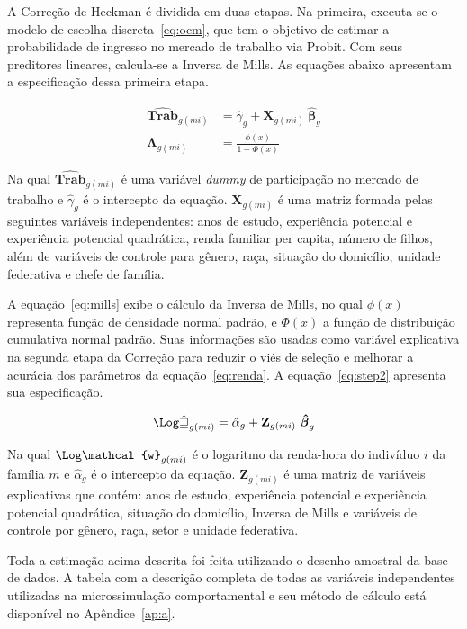 A Correção de Heckman \cite{heckman79} é dividida em duas etapas. Na primeira, executa-se o modelo de escolha discreta~\eqref{eq:ocm}, que tem o objetivo de estimar a probabilidade de ingresso no mercado de trabalho via Probit. Com seus preditores lineares, calcula-se a Inversa de Mills. As equações abaixo apresentam a especificação dessa primeira etapa.

\begin{align}
	\boldsymbol{\hat{Trab}}_{g(mi)} &= \hat{\gamma}_g + \mathbf{X}_{g(mi)} \ \boldsymbol{\hat{\beta}}_g \label{eq:step1} \\
	\boldsymbol{\Lambda}_{g(mi)}    &= \frac{\phi(x)}{1 - \Phi(x)} \label{eq:mills}
\end{align}

Na qual $\boldsymbol{\hat{Trab}}_{g(mi)}$ é uma variável \textit{dummy} de participação no mercado de trabalho e $\hat{\gamma}_g$ é o intercepto da equação. $\mathbf{X}_{g(mi)}$ é uma matriz formada pelas seguintes variáveis independentes: anos de estudo, experiência potencial e experiência potencial quadrática, renda familiar per capita, número de filhos, além de variáveis de controle para gênero, raça, situação do domicílio, unidade federativa e chefe de família.

A equação~\eqref{eq:mills} exibe o cálculo da Inversa de Mills, no qual $\phi(x)$ representa função de densidade normal padrão, e $\Phi(x)$ a função de distribuição cumulativa normal padrão. Suas informações são usadas como variável explicativa na segunda etapa da Correção para reduzir o viés de seleção e melhorar a acurácia dos parâmetros da equação~\eqref{eq:renda}. A equação~\eqref{eq:step2} apresenta sua especificação.

\begin{align}
	\mathbf{\Log \mathcal{\hat{w}}}_{g(mi)} = \hat{\alpha}_g + \mathbf{Z}_{g(mi)} \ \boldsymbol{\hat{\beta}}_g \label{eq:step2}
\end{align}

Na qual $\mathbf{\Log \mathcal{w}}_{g(mi)}$ é o logaritmo da renda-hora do indivíduo $i$ da família $m$ e $\hat{\alpha}_g$ é o intercepto da equação. $\mathbf{Z}_{g(mi)}$ é uma matriz de variáveis explicativas que contém: anos de estudo, experiência potencial e experiência potencial quadrática, situação do domicílio, Inversa de Mills e variáveis de controle por gênero, raça, setor e unidade federativa.

Toda a estimação acima descrita foi feita utilizando o desenho amostral da base de dados. A tabela com a descrição completa de todas as variáveis independentes utilizadas na microssimulação comportamental e seu método de cálculo está disponível no Apêndice~\ref{ap:a}.


